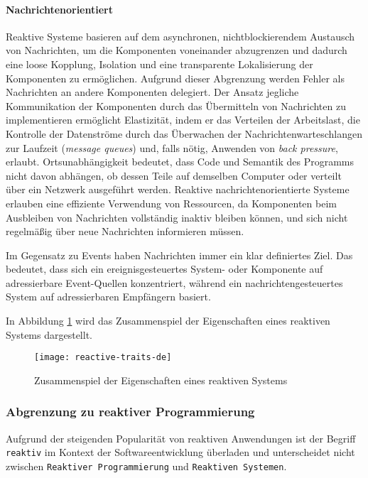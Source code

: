 \paragraph{Nachrichtenorientiert}Reaktive Systeme basieren auf dem asynchronen, nichtblockierendem Austausch von Nachrichten, um die Komponenten voneinander
abzugrenzen und dadurch eine loose Kopplung, Isolation und eine transparente Lokalisierung der Komponenten zu ermöglichen.
Aufgrund dieser Abgrenzung werden Fehler als Nachrichten an andere Komponenten delegiert.
Der Ansatz jegliche Kommunikation der Komponenten durch das Übermitteln von Nachrichten zu implementieren ermöglicht Elastizität,
indem er das Verteilen der Arbeitslast, die Kontrolle der Datenströme durch das Überwachen der Nachrichtenwarteschlangen zur Laufzeit
(\textit{message queues}) und, falls nötig, Anwenden von \textit{back pressure}, erlaubt.
Ortsunabhängigkeit bedeutet, dass Code und Semantik des Programms nicht davon abhängen, ob dessen Teile auf demselben Computer
oder verteilt über ein Netzwerk ausgeführt werden.
Reaktive nachrichtenorientierte Systeme erlauben eine effiziente Verwendung von Ressourcen, da Komponenten beim Ausbleiben von
Nachrichten vollständig inaktiv bleiben können, und sich nicht regelmäßig über neue Nachrichten informieren müssen.\parencite{ReactiveSystems}

Im Gegensatz zu Events haben Nachrichten immer ein klar definiertes Ziel.
Das bedeutet, dass sich ein ereignisgesteuertes System- oder Komponente auf adressierbare Event-Quellen konzentriert,
während ein nachrichtengesteuertes System auf adressierbaren Empfängern basiert.

In Abbildung \ref{fig:reactive-traits} wird das Zusammenspiel der Eigenschaften eines reaktiven Systems dargestellt.

\begin{figure}[ht!]
  \centering
  \texttt{[image: reactive-traits-de]}
  \caption{Zusammenspiel der Eigenschaften eines reaktiven Systems \parencite{ReactiveSystems}}
  \label{fig:reactive-traits}
\end{figure}
\newpage
\subsubsection{Abgrenzung zu reaktiver Programmierung}
\label{subsubsection:abgrenzung_reaktive_programmierung}
Aufgrund der steigenden Popularität von reaktiven Anwendungen ist der Begriff \verb|reaktiv| im Kontext der Softwareentwicklung
überladen und unterscheidet nicht zwischen \linebreak\verb|Reaktiver Programmierung| und \verb|Reaktiven Systemen|.

